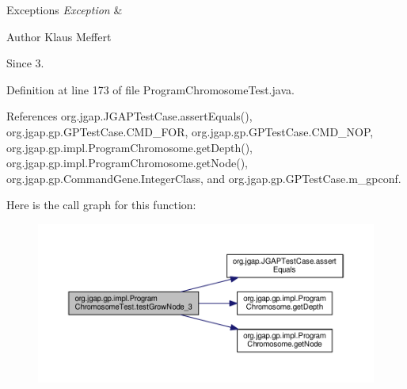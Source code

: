 \begin{DoxyExceptions}{Exceptions}
{\em Exception} & \\
\hline
\end{DoxyExceptions}
\begin{DoxyAuthor}{Author}
Klaus Meffert 
\end{DoxyAuthor}
\begin{DoxySince}{Since}
3. 
\end{DoxySince}


Definition at line 173 of file Program\-Chromosome\-Test.\-java.



References org.\-jgap.\-J\-G\-A\-P\-Test\-Case.\-assert\-Equals(), org.\-jgap.\-gp.\-G\-P\-Test\-Case.\-C\-M\-D\-\_\-\-F\-O\-R, org.\-jgap.\-gp.\-G\-P\-Test\-Case.\-C\-M\-D\-\_\-\-N\-O\-P, org.\-jgap.\-gp.\-impl.\-Program\-Chromosome.\-get\-Depth(), org.\-jgap.\-gp.\-impl.\-Program\-Chromosome.\-get\-Node(), org.\-jgap.\-gp.\-Command\-Gene.\-Integer\-Class, and org.\-jgap.\-gp.\-G\-P\-Test\-Case.\-m\-\_\-gpconf.



Here is the call graph for this function\-:
\nopagebreak
\begin{figure}[H]
\begin{center}
\leavevmode
\includegraphics[width=350pt]{classorg_1_1jgap_1_1gp_1_1impl_1_1_program_chromosome_test_aef6cc2124d212631e5c9e9ac85575700_cgraph}
\end{center}
\end{figure}



